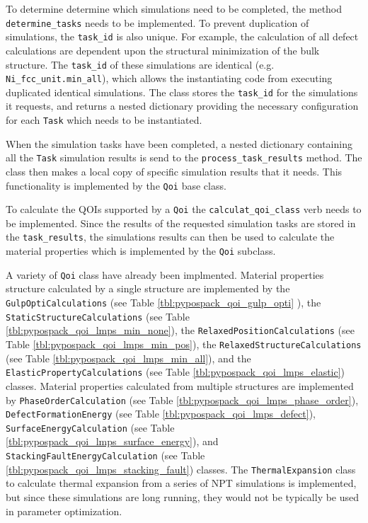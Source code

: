 To determine determine which simulations need to be completed, the method \verb|determine_tasks| needs to be implemented.  To prevent duplication of simulations, the \verb|task_id| is also unique.  For example, the calculation of all defect calculations are dependent upon the structural minimization of the bulk structure.  The \verb|task_id| of these simulations are identical (e.g. \verb|Ni_fcc_unit.min_all|), which allows the instantiating code from executing duplicated identical simulations.  The class stores the \verb|task_id| for the simulations it requests, and returns a nested dictionary providing the necessary configuration for each \verb|Task| which needs to be instantiated.

When the simulation tasks have been completed, a nested dictionary containing all the \verb|Task| simulation results is send to the \verb|process_task_results| method.  The class then makes a local copy of specific simulation results that it needs.  This functionality is implemented by the \verb|Qoi| base class.

To calculate the QOIs supported by a \verb|Qoi| the \verb|calculat_qoi_class| verb needs to be implemented.  Since the results of the requested simulation tasks are stored in the \verb|task_results|, the simulations results can then be used to calculate the material properties which is implemented by the \verb|Qoi| subclass.

A variety of \verb|Qoi| class have already been implmented.  Material properties structure calculated by a single structure are implemented by
the \verb|GulpOptiCalculations|
    (see Table \ref{tbl:pypospack_qoi_gulp_opti} ),
the \verb|StaticStructureCalculations|
    (see Table \ref{tbl:pypospack_qoi_lmps_min_none}),
the \verb|RelaxedPositionCalculations|
    (see Table \ref{tbl:pypospack_qoi_lmps_min_pos}),
the \verb|RelaxedStructureCalculations|
    (see Table \ref{tbl:pypospack_qoi_lmps_min_all}),
and the \verb|ElasticPropertyCalculations|
    (see Table \ref{tbl:pypospack_qoi_lmps_elastic})
		classes.
Material properties calculated from multiple structures are implemented by
\verb|PhaseOrderCalculation|
    (see Table \ref{tbl:pypospack_qoi_lmps_phase_order}),
\verb|DefectFormationEnergy|
    (see Table \ref{tbl:pypospack_qoi_lmps_defect}),
\verb|SurfaceEnergyCalculation|
    (see Table \ref{tbl:pypospack_qoi_lmps_surface_energy}), and
\verb|StackingFaultEnergyCalculation|
    (see Table
		    \ref{tbl:pypospack_qoi_lmps_stacking_fault}) classes.
The \verb|ThermalExpansion| class to calculate thermal expansion from a series of NPT simulations is implemented, but since these simulations are long running, they would not be typically be used in parameter optimization.

